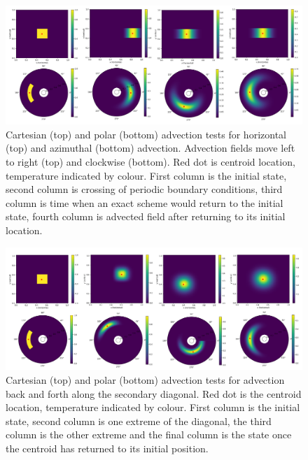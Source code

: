 \documentclass{article}
\begin{document}
\begin{figure}
	\center
	\includegraphics[scale=1.20]{combinedPeriodic.png}
	\caption{Cartesian (top) and polar (bottom) advection tests for horizontal (top) and azimuthal (bottom) advection. Advection fields move left to right (top) and clockwise (bottom). Red dot is centroid location, temperature indicated by colour. First column is the initial state, second column is crossing of periodic boundary conditions, third column is time when an exact scheme would return to the initial state, fourth column is advected field after returning to its initial location.}
	\label{periodic advection figure}
\end{figure}


\begin{figure}
	\center
	\includegraphics[scale=1.20]{combinedDiagonal.png}
	\caption{Cartesian (top) and polar (bottom) advection tests for advection back and forth along the secondary diagonal. Red dot is the centroid location, temperature indicated by colour. First column is the initial state, second column is one extreme of the diagonal, the third column is the other extreme and the final column is the state once the centroid has returned to its initial position.}
	\label{diagonal advection figure}
\end{figure}
\end{document}
